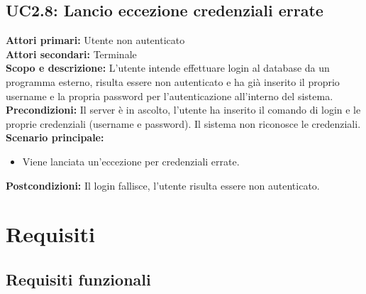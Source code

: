 \documentclass{scalatekids-article}
\begin{document}
\subsection{UC2.8: Lancio eccezione credenziali errate}

\textbf{Attori primari:} Utente non autenticato\\
\textbf{Attori secondari:} Terminale\\
\textbf{Scopo e descrizione:}
L'utente intende effettuare login al database da un programma  esterno, risulta essere non autenticato e ha già inserito il proprio username e la propria password per l'autenticazione all'interno del sistema.\\
\textbf{Precondizioni:} Il server è in ascolto, l'utente ha inserito il comando di login e le proprie credenziali (username e password). Il sistema non riconosce le credenziali.\\
\textbf{Scenario principale:}
\begin{itemize}
\item Viene lanciata un'eccezione per credenziali errate.
\end{itemize}
\textbf{Postcondizioni:} Il login fallisce, l'utente risulta essere non autenticato.

\section{Requisiti}

\subsection{Requisiti funzionali}
\end{document}
